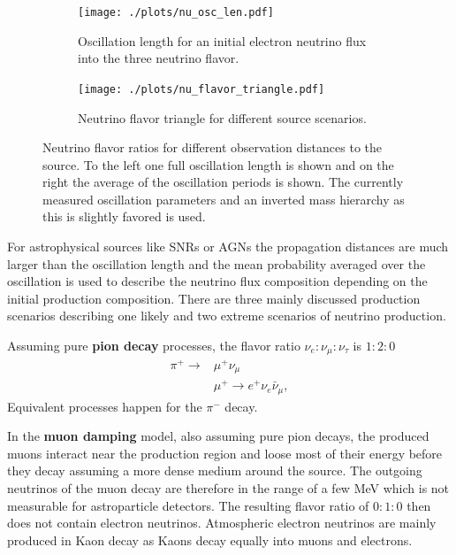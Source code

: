 \begin{figure}
    \centering
    \begin{subfigure}[t]{0.47\textwidth}
        \centering
        \texttt{[image: ./plots/nu\_osc\_len.pdf]}
        \caption{Oscillation length for an initial electron neutrino flux into the three neutrino flavor.}
        \label{fig:nu_osc_len}
    \end{subfigure}
    \hfill
    \begin{subfigure}[t]{0.47\textwidth}
        \centering
        \texttt{[image: ./plots/nu\_flavor\_triangle.pdf]}
        \caption{Neutrino flavor triangle for different source scenarios.}
        \label{fig:nu_flavor_trangle}
    \end{subfigure}
    \caption{Neutrino flavor ratios for different observation distances to the source. To the left one full oscillation length is shown and on the right the average of the oscillation periods is shown. The currently measured oscillation parameters \cite{PDG20} and  an inverted mass hierarchy as this is slightly favored is used.}
    \label{fig:nu_osc}
\end{figure}

For astrophysical sources like SNRs or AGNs the propagation distances are much larger than the oscillation length and the mean probability averaged over the oscillation is used to describe the neutrino flux composition depending on the initial production composition.
There are three mainly discussed production scenarios describing one likely and two extreme scenarios of neutrino production.

Assuming pure \textbf{pion decay} processes, the flavor ratio $\nu_e : \nu_{\mu} : \nu_{\tau}$ is $1:2:0$
\begin{align}
    \pi^+ \to &\mu^+ \nu_\mu \\
    &\mu^+ \to e^+ \nu_e \bar{\nu}_{\mu} ,
\end{align}
Equivalent processes happen for the $\pi^-$ decay.

In the \textbf{muon damping} model, also assuming pure pion decays, the produced muons interact near the production region and loose most of their energy before they decay assuming a more dense medium around the source.
The outgoing neutrinos of the muon decay are therefore in the range of a few MeV which is not measurable for astroparticle detectors.
The resulting flavor ratio of $0:1:0$ then does not contain electron neutrinos.
Atmospheric electron neutrinos are mainly produced in Kaon decay as Kaons decay equally into muons and electrons.

